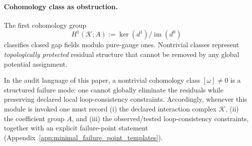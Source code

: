 \paragraph{Cohomology class as obstruction.}
\InterfaceTag The first cohomology group
\[
H^1(\mathcal{K};A):=\ker(d^1)/\operatorname{im}(d^0)
\]
classifies closed gap fields modulo pure-gauge ones.
Nontrivial classes represent \emph{topologically protected} residual structure that cannot be removed by any global potential assignment.

\begin{remark}
\AuditTag In the audit language of this paper, a nontrivial cohomology class $[\omega]\ne 0$ is a structured failure mode:
one cannot globally eliminate the residuals while preserving declared local loop-consistency constraints.
Accordingly, whenever this module is invoked one must record (i) the declared interaction complex $\mathcal{K}$, (ii) the coefficient group $A$, and (iii) the observed/tested loop-consistency constraints, together with an explicit failure-point statement (Appendix~\ref{app:minimal_failure_point_templates}).
\end{remark}

